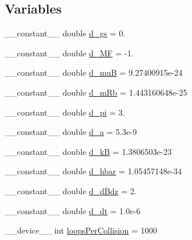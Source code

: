 \subsection*{Variables}
\begin{DoxyCompactItemize}
\item 
\+\_\+\+\_\+constant\+\_\+\+\_\+ double \hyperlink{move_atoms_8cu_ad7fc9ddbbf69cdea9bade997bd3f58f4}{d\+\_\+gs} = 0.
\item 
\+\_\+\+\_\+constant\+\_\+\+\_\+ double \hyperlink{move_atoms_8cu_ad5c6a29d5e5d7f81c07fcdeac2e12ee8}{d\+\_\+\+M\+F} = -\/1.
\item 
\+\_\+\+\_\+constant\+\_\+\+\_\+ double \hyperlink{move_atoms_8cu_a93a53c442fbe59aedf7224c0f142979c}{d\+\_\+mu\+B} = 9.\+27400915e-\/24
\item 
\+\_\+\+\_\+constant\+\_\+\+\_\+ double \hyperlink{move_atoms_8cu_a19b0469e2c969c9dc1f4d2b9d075ef98}{d\+\_\+m\+Rb} = 1.\+443160648e-\/25
\item 
\+\_\+\+\_\+constant\+\_\+\+\_\+ double \hyperlink{move_atoms_8cu_a246b126f6551267fd21c168b0c1b4fac}{d\+\_\+pi} = 3.
\item 
\+\_\+\+\_\+constant\+\_\+\+\_\+ double \hyperlink{move_atoms_8cu_a9de002c64acd76b9a5a11c0e3519838c}{d\+\_\+a} = 5.\+3e-\/9
\item 
\+\_\+\+\_\+constant\+\_\+\+\_\+ double \hyperlink{move_atoms_8cu_a02c2b3a2e3a9d15ae261492f19abb6e0}{d\+\_\+k\+B} = 1.\+3806503e-\/23
\item 
\+\_\+\+\_\+constant\+\_\+\+\_\+ double \hyperlink{move_atoms_8cu_a42ed36be77a88944d259857a94f80eb4}{d\+\_\+hbar} = 1.\+05457148e-\/34
\item 
\+\_\+\+\_\+constant\+\_\+\+\_\+ double \hyperlink{move_atoms_8cu_afa16fa4a33416df0d9677c9cbf1c6619}{d\+\_\+d\+Bdz} = 2.
\item 
\+\_\+\+\_\+constant\+\_\+\+\_\+ double \hyperlink{move_atoms_8cu_a73197eed5bcda31eef79ed204c0928fe}{d\+\_\+dt} = 1.\+0e-\/6
\item 
\+\_\+\+\_\+device\+\_\+\+\_\+ int \hyperlink{move_atoms_8cu_a46df0a465a8e923e9973ea54f85a0a0d}{loops\+Per\+Collision} = 1000
\end{DoxyCompactItemize}


